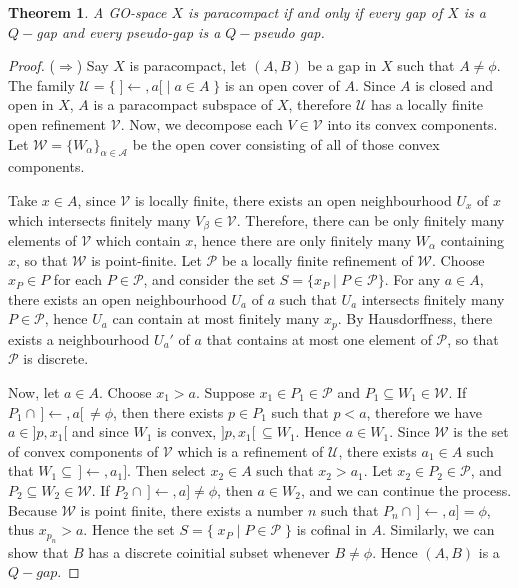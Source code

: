 \documentclass[12pt,oneside,english]{amsbook}
\numberwithin{equation}{section} %
\numberwithin{figure}{section} %
\theoremstyle{plain}
\numberwithin{section}{chapter}
\newtheorem{thm}{Theorem}[section]
\theoremstyle{plain}
\begin{document}
\begin{thm}\label{paracompact:go:2}
  A GO-space $X$ is paracompact if and only if every gap of $X$ is a $Q-$gap and every pseudo-gap is a $Q-$pseudo gap.
\end{thm}
\begin{proof}
  ($\Rightarrow$) Say $X$ is paracompact, let $(A,B)$ be a gap in $X$ such that $A \neq \phi$. The family $\mathcal{U} = \{\; ]\leftarrow,a[ \; | \; a \in A \; \}$ is an open cover of $A$. Since $A$ is closed and open in $X$, $A$ is a paracompact subspace of $X$, therefore $\mathcal{U}$ has a locally finite open refinement $\mathcal{V}$. Now, we decompose each $V \in \mathcal{V}$ into its convex components. Let $\mathcal{W} = \{  W_{\alpha}  \}_{\alpha \in \mathcal{A}}$ be the open cover consisting of all of those convex components.

  Take $x \in A$, since $\mathcal{V}$ is locally finite, there exists an open neighbourhood $U_{x}$ of $x$ which intersects finitely many $V_{\beta} \in \mathcal{V}$. Therefore, there can be only finitely many elements of $\mathcal{V}$ which contain $x$, hence there are only finitely many $W_{\alpha}$ containing $x$, so that $\mathcal{W}$ is point-finite. Let $\mathcal{P}$ be a locally finite refinement of $\mathcal{W}$. Choose $x_{P} \in P$ for each $P \in \mathcal{P}$, and consider the set $S = \{ x_{P} \; | \; P \in \mathcal{P}  \}$. For any $a \in A$, there exists an open neighbourhood $U_{a}$ of $a$ such that $U_{a}$ intersects finitely many $P \in \mathcal{P}$, hence $U_{a}$ can contain at most finitely many $x_{p}$. By Hausdorffness, there exists a neighbourhood $U_a'$ of $a$ that contains at most one element of $\mathcal{P}$, so that $\mathcal{P}$ is discrete.

  Now, let $a \in A$. Choose $x_1 > a$. Suppose $x_1 \in P_1 \in \mathcal{P}$ and $P_1 \subseteq W_1 \in \mathcal{W}$. If $P_1 \cap \, ]\leftarrow,a[ \, \neq \phi$, then there exists $ p \in P_1$ such that $p < a$, therefore we have $a \in ]p,x_1[$ and since $W_1$ is convex, $]p,x_1[ \, \subseteq W_1$. Hence $a \in W_1$. Since $\mathcal{W}$ is the set of convex components of $\mathcal{V}$ which is a refinement of $\mathcal{U}$, there exists $a_1 \in A$ such that $W_1 \subseteq \, ]\leftarrow, a_1]$. Then select $x_2 \in A$ such that $x_2 > a_1$. Let $x_2 \in P_2 \in \mathcal{P}$, and $P_2 \subseteq W_2 \in \mathcal{W}$. If $P_2 \cap \, ]\leftarrow, a] \neq \phi$, then $a \in W_2$, and we can continue the process. Because $\mathcal{W}$ is point finite, there exists a number $n$ such that $P_n \cap \, ]\leftarrow, a] = \phi$, thus $x_{p_{n}} > a$. Hence the set $S = \{ \; x_{P} \; | \; P \in \mathcal{P} \; \}$ is cofinal in $A$. Similarly, we can show that $B$ has a discrete coinitial subset whenever $B \neq \phi$. Hence $(A,B)$ is a $Q-gap$.


\end{proof}
\end{document}
